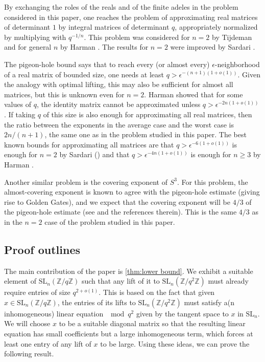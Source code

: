 \documentclass[12pt, a4paper]{amsart}
\numberwithin{equation}{section}
\theoremstyle{definition}
\newcommand{\Z}{\mathbb{Z}}
\newcommand{\SL}{\mathrm{SL}}
\begin{document}
By exchanging the roles of the reals and of the finite adeles in the problem considered in this paper, one reaches the problem of approximating real matrices of determinant $1$ by integral matrices of determinant $q$, appropriately normalized by multiplying with $q^{-1/n}$. This problem was considered for $n=2$ by Tijdeman \cite{Tijdeman1986approximation} and for general $n$ by Harman \cite{harman1990approximation}. The results for $n=2$ were improved by Sardari \cite{sardari2019optimal}.

The pigeon-hole bound says that to reach every (or almost every) $\epsilon$-neighborhood of a real matrix of bounded size, one needs at least $q>\epsilon^{-(n+1)(1+o(1))}$. Given the analogy with optimal lifting, this may also be sufficient for almost all matrices, but this is unknown even for $n=2$. Harman showed that for some values of $q$, the identity matrix cannot be approximated unless $q> \epsilon^{-2n(1+o(1))}$ \cite[Theorem 1]{harman1990approximation}. If taking $q$ of this size is also enough for approximating all real matrices, then the ratio between the exponents in the average case and the worst case is $2n/(n+1)$, the same one as in the problem studied in this paper. The best known bounds for approximating all matrices are that $q> \epsilon^{-6(1+o(1))}$ is enough for $n=2$ by Sardari (\cite[Corollary 1.1]{sardari2019optimal}) and that
 $q> \epsilon^{-4n(1+o(1))}$ is enough for $n\ge 3$ by Harman \cite[Theorem 3]{harman1990approximation}.

Another similar problem is the covering exponent of $S^3$. For this problem, the almost-covering exponent is known to agree with the pigeon-hole estimate (giving rise to Golden Gates), and we expect that the covering exponent will be $4/3$ of the pigeon-hole estimate (see \cite{browning2019twisted} and the references therein). 
This is the same $4/3$ as in the $n=2$ case of the problem studied in this paper.

\subsection{Proof outlines}\label{sec:outline}

The main contribution of the paper is \cref{thm:lower bound}.
We exhibit a suitable element of $\SL_n(\Z/q\Z)$ such that any lift of it to
$\SL_n(\Z/q^2\Z)$ must already require entries of size $q^{2+o(1)}$.
This is based on the fact that given $x\in\SL_n(\Z/q\Z)$, the entries of its lifts to
$\SL_n(\Z/q^2\Z)$ must satisfy a(n inhomogeneous) linear equation $\mod q^2$
given by the tangent space to $x$ in $\SL_n$.
We will choose $x$ to be a suitable diagonal matrix so that the resulting linear
equation has small coefficients but a large inhomogeneous term, which forces at least
one entry of any lift of $x$ to be large.
Using these ideas, we can prove the following result.
\end{document}
